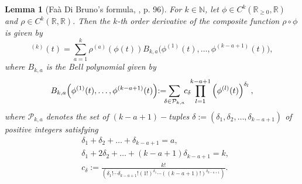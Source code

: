 \documentclass[letterpaper, 10pt]{article}
\newtheorem{lem}{Lemma}
\newcommand{\reels}{\mathbb{R}}
\newcommand{\pcal}{\mathcal{P}}
\begin{document}
\begin{lem}[Fa\`a Di Bruno's formula, \cite{fdb}, p. 96]
\label{lem:fa_di}
For  $k\in\mathbb N$, let $\phi\in C^{k}( \reels_{\geq 0} , \reels )$ and $\rho\in C^{k}( \reels , \reels )$. Then the $k$-th order derivative of the composite function $\rho \circ \phi$ is given by
\begin{equation*}
[ \rho \circ \phi ]^{(k)}(t) =  \sum\limits_{a=1}^k \rho^{(a)} (\phi(t)) B_{k,a}\Big(\phi^{(1)}(t), \ldots , \phi^{(k-a+1)}(t)\Big),
\end{equation*}
where $B_{k,a}$ is the Bell polynomial given by
\begin{align*}
B_{k,a}\Big(\phi^{(1)}(t), \ldots ,  \phi^{(k-a+1)}(t)\Big)\hspace{-1mm}:=\hspace{-2mm}\sum\limits_{\delta \in \pcal_{k,a}} \hspace{-1mm}c_{\delta} \hspace{-1mm}\prod\limits_{l=1}^{k-a+1} \left( \phi^{(l)}(t) \right)^{\delta_l},
\end{align*}
where $\pcal_{k,a}$ denotes the set of $(k-a+1)-$tuples $\delta :=(\delta_1 , \delta_2, \ldots , \delta_{k-a+1})$  of positive integers satisfying 
\begin{align*}
&\delta_1 + \delta_2 + \ldots +\delta_{k-a+1} = a,\\
&\delta_1 +2 \delta_2 + \ldots + (k-a+1) \delta_{k-a+1} = k,\\
&c_{\delta}:=\frac{k!}{\left(\delta_1 ! \cdots \delta_{k-a+1}! (1!)^{\delta_1} \cdots ((k-a+1)!)^{\delta_{k-a+1}}\right)}.
\end{align*}
\end{lem}





\end{document}
